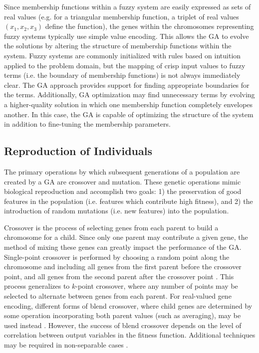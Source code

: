 \documentclass[12pt]{report}
\begin{document}
Since membership functions within a fuzzy system are easily expressed as sets of real values (e.g. for a triangular membership function, a triplet of real values $(x_1, x_2, x_3)$ define the function), the genes within the chromosomes representing fuzzy systems typically use simple value encoding. This allows the GA to evolve the solutions by altering the structure of membership functions within the system. Fuzzy systems are commonly initialized with rules based on intuition applied to the problem domain, but the mapping of crisp input values to fuzzy terms (i.e. the boundary of membership functions) is not always immediately clear. The GA approach provides support for finding appropriate boundaries for the terms. Additionally, GA optimization may find unnecessary terms by evolving a higher-quality solution in which one membership function completely envelopes another. In this case, the GA is capable of optimizing the structure of the system in addition to fine-tuning the membership parameters.

\subsection{Reproduction of Individuals}
The primary operations by which subsequent generations of a population are created by a GA are crossover and mutation. These genetic operations mimic biological reproduction and accomplish two goals: 1) the preservation of good features in the population (i.e. features which contribute high fitness), and 2) the introduction of random mutations (i.e. new features) into the population. 

Crossover is the process of selecting genes from each parent to build a chromosome for a child. Since only one parent may contribute a given gene, the method of mixing these genes can greatly impact the performance of the GA. Single-point crossover is performed by choosing a random point along the chromosome and including all genes from the first parent before the crossover point, and all genes from the second parent after the crossover point \cite{holland1992genetic}. This process generalizes to $k$-point crossover, where any number of points may be selected to alternate between genes from each parent. For real-valued gene encoding, different forms of blend crossover, where child genes are determined by some operation incorporating both parent values (such as averaging), may be used instead \cite{Eshelman1993Real-codedInterval-schemata}. However, the success of blend crossover depends on the level of correlation between output variables in the fitness function. Additional techniques may be required in non-separable cases \cite{Takahashi2001AAlgorithms, Buche2005AcceleratingModels}.
\end{document}
